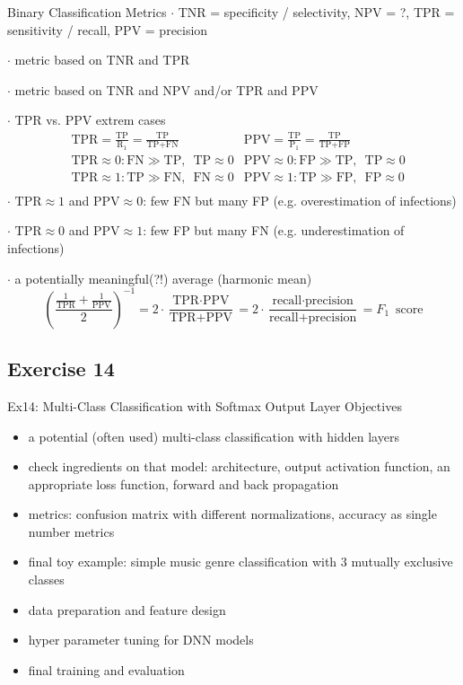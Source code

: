 \documentclass[mathserif, aspectratio=1610]{intbeamer}
\begin{document}
\begin{frame}[t]{Binary Classification Metrics}
%
$\cdot$ TNR = specificity / selectivity, NPV = ?, TPR = sensitivity / recall, PPV = precision

$\cdot$ metric based on TNR and TPR

$\cdot$ metric based on TNR and NPV and/or TPR and PPV

$\cdot$ TPR vs. PPV extrem cases
\begin{align*}
&\text{TPR}=\frac{\text{TP}}{\text{R}_1}=\frac{\text{TP}}{\text{TP}+\text{FN}}
&\text{PPV}=\frac{\text{TP}}{\text{P}_1}=\frac{\text{TP}}{\text{TP}+\text{FP}}\\
&\text{TPR}\approx 0: \text{FN} \gg \text{TP},\,\,\, \text{TP} \approx 0
&\text{PPV}\approx 0: \text{FP} \gg \text{TP},\,\,\, \text{TP} \approx 0\\
&\text{TPR}\approx 1: \text{TP} \gg \text{FN},\,\,\, \text{FN} \approx 0
&\text{PPV}\approx 1: \text{TP} \gg \text{FP},\,\,\, \text{FP} \approx 0\\
\end{align*}
%
$\cdot$ $\text{TPR}\approx 1$ and $\text{PPV}\approx 0$: few FN but many FP (e.g. overestimation of infections)

$\cdot$ $\text{TPR}\approx 0$ and $\text{PPV}\approx 1$: few FP but many FN (e.g. underestimation of infections)

$\cdot$ a potentially meaningful(?!) average (harmonic mean)
$$
\left(\frac{\frac{1}{\text{TPR}} + \frac{1}{\text{PPV}}}{2}\right)^{-1}
=
2 \cdot \frac{\text{TPR}\cdot\text{PPV}}{\text{TPR}+\text{PPV}}
=
2 \cdot \frac{\text{recall}\cdot\text{precision}}{\text{recall}+\text{precision}}
=F_1\,\,\,\text{score}
$$

\end{frame}






\subsection{Exercise 14}

\begin{frame}{Ex14: Multi-Class Classification with Softmax Output Layer}
Objectives
\begin{itemize}
\item a potential (often used) multi-class classification with hidden layers
\item check ingredients on that model: architecture, output activation function, an appropriate loss function, forward and back propagation
\item metrics: confusion matrix with different normalizations, accuracy as single number metrics
\item final toy example: simple music genre classification with 3 mutually exclusive classes
\item data preparation and feature design
\item hyper parameter tuning for DNN models
\item final training and evaluation
\end{itemize}
\end{frame}
\end{document}
